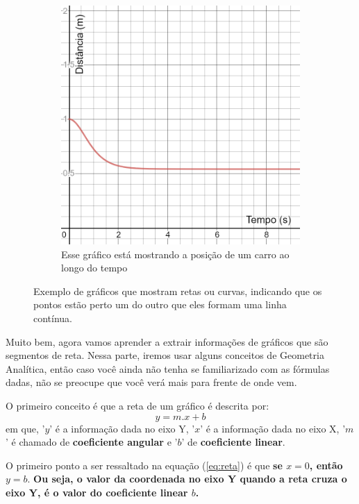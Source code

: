 \documentclass[12pt]{extarticle}
\newcommand{\<}{\langle}
\renewcommand{\>}{\rangle}
\theoremstyle{definition}
\begin{document}
\begin{figure}[H]
\begin{subfigure}[b]{0.4\textwidth}
         \includegraphics[width=\textwidth]{curve.png}
         \caption{Esse gráfico está mostrando a posição de um carro ao longo do tempo}
         \label{fig:curve}
     \end{subfigure}
     \caption{Exemplo de gráficos que mostram retas ou curvas, indicando que os pontos estão perto um do outro que eles formam uma linha contínua.}
     \label{fig:graph_plots}
\end{figure}

Muito bem, agora vamos aprender a extrair informações de gráficos que são segmentos de reta. Nessa parte, iremos usar alguns conceitos de Geometria Analítica, então caso você ainda não tenha se familiarizado com as fórmulas dadas, não se preocupe que você verá mais para frente de onde vem.

O primeiro conceito é que a reta de um gráfico é descrita por:
\begin{equation}\label{eq:reta}
    y = m.x + b
\end{equation}
em que, '$y$' é a informação dada no eixo Y, '$x$' é a informação dada no eixo X, '$m$' é chamado de \textbf{coeficiente angular} e '$b$' de \textbf{coeficiente linear}.

O primeiro ponto a ser ressaltado na equação (\ref{eq:reta}) é que \textbf{se $x=0$, então $y=b$}. \textbf{Ou seja, o valor da coordenada no eixo Y quando a reta cruza o eixo Y, é o valor do coeficiente linear $b$.}
\end{document}
